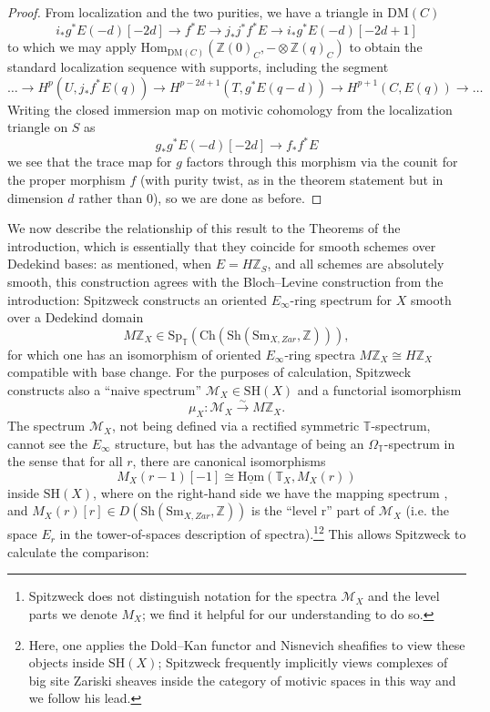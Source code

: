 \documentclass[a4paper,reqno,11pt]{amsart}
\theoremstyle{plain}
\theoremstyle{definition}
\theoremstyle{remark}
\newcommand{\Ch}{{\mathrm{Ch}}}
\newcommand{\Sh}{{\mathrm{Sh}}}
\newcommand{\Sm}{{\mathrm{Sm}}}
\newcommand{\Z}{\mathbb{Z}}
\newcommand{\T}{\mathbb{T}}
\newcommand{\DM}{\mathrm{DM}}
\newcommand{\SH}{\mathrm{SH}}
\newcommand{\Hom}{\mathrm{Hom}}
\begin{document}
\begin{proof}
    From localization and the two purities, we have a triangle in $\DM(C)$
    \[
    i_*g^*E(-d)[-2d] \to f^* E \to j_* j^* f^* E \to i_*g^*E(-d)[-2d+1]
    \]
    to which we may apply $\Hom_{\DM(C)}( \Z(0)_C,- \otimes \Z(q)_C)$ to obtain the standard localization sequence with supports, including the segment 
    \[
    \ldots \to H^p(U,j_*f^*E(q))\to H^{p-2d+1}(T,g^*E(q-d))\to  H^{p+1}(C,E(q)) \to \ldots
    \]
    Writing the closed immersion map on motivic cohomology from the localization triangle on $S$ as
    \[
        g_*g^* E(-d)[-2d] \to f_*f^*E
    \]
    we see that the trace map for $g$ factors through this morphism via the counit for the proper morphism $f$ (with purity twist, as in the theorem statement but in dimension $d$ rather than $0$), so we are done as before.
\end{proof}
    
We now describe the relationship of this result to the Theorems of the introduction, which is essentially that they coincide for smooth schemes over Dedekind bases: as mentioned, when $E=H\Z_S$, and all schemes are absolutely smooth, this construction agrees with the Bloch--Levine construction from the introduction: Spitzweck constructs \cite[\S4.4]{Sp} an oriented $E_\infty$-ring spectrum for $X$ smooth over a Dedekind domain
\[
M\Z_X \in \mathrm{Sp}_\T(\Ch(\Sh(\Sm_{X,Zar}, \Z))),
\]
for which one has an isomorphism of oriented $E_\infty$-ring spectra $M\Z_X \cong H\Z_X$ \cite{BH} compatible with base change. For the purposes of calculation, Spitzweck constructs also a ``naive spectrum'' $\mathcal{M}_X\in \SH(X)$ and a functorial isomorphism
\[
\mu_X:\mathcal{M}_X\xrightarrow{\sim} M\Z_X.
\]
The spectrum $\mathcal{M}_X$, not being defined via a rectified symmetric $\T$-spectrum, cannot see the $E_\infty$ structure, but has the advantage of being an $\Omega_\T$-spectrum in the sense that for all $r$, there are canonical isomorphisms
\[
M_X(r-1)[-1] \cong \underline{\Hom}(\T_X, M_X(r))
\]
inside $\SH(X)$, where on the right-hand side we have the mapping spectrum \cite[Proposition 5.29]{Sp}, and $M_X(r)[r]\in D(\Sh(\Sm_{X,Zar},\Z))$ is the ``level r'' part of $\mathcal{M}_X$ (i.e. the space $E_r$ in the tower-of-spaces description of spectra).\footnote{Spitzweck does not distinguish notation for the spectra $\mathcal{M}_X$ and the level parts we denote $M_X$; we find it helpful for our understanding to do so.}\footnote{Here, one applies the Dold--Kan functor and Nisnevich sheafifies to view these objects inside $\SH(X)$; Spitzweck frequently implicitly views complexes of big site Zariski sheaves inside the category of motivic spaces in this way and we follow his lead.} This allows Spitzweck to calculate the comparison:
\end{document}
